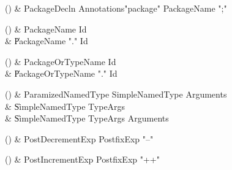\begin{bbgrammarappendix}{3.8in}

() & PackageDecln \label{prod:PackageDecln}  \: Annotations\opt \xcd"package" PackageName \xcd";"  \\


\end{bbgrammarappendix}

\begin{bbgrammarappendix}{3.9in}

() & PackageName \label{prod:PackageName}  \: Id  \\

 &    \| PackageName \xcd"." Id \\

\end{bbgrammarappendix}

\begin{bbgrammarappendix}{3.3in}

() & PackageOrTypeName \label{prod:PackageOrTypeName}  \: Id  \\

 &    \| PackageOrTypeName \xcd"." Id \\

\end{bbgrammarappendix}

\begin{bbgrammarappendix}{3.2in}

() & ParamizedNamedType \label{prod:ParamizedNamedType}  \: SimpleNamedType Arguments  \\

 &    \| SimpleNamedType TypeArgs \\
 &    \| SimpleNamedType TypeArgs Arguments \\

\end{bbgrammarappendix}

\begin{bbgrammarappendix}{3.4in}

() & PostDecrementExp \label{prod:PostDecrementExp}  \: PostfixExp \xcd"--"  \\


\end{bbgrammarappendix}

\begin{bbgrammarappendix}{3.4in}

() & PostIncrementExp \label{prod:PostIncrementExp}  \: PostfixExp \xcd"++"  \\


\end{bbgrammarappendix}

